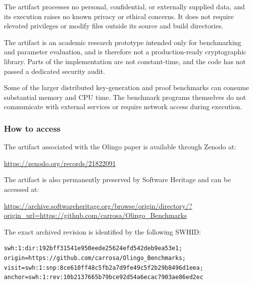 \documentclass[nonacm,sigconf]{acmart}
\begin{document}
The artifact processes no personal, confidential, or externally supplied data,
and its execution raises no known privacy or ethical concerns. It does not
require elevated privileges or modify files outside its source and build
directories.

The artifact is an academic research prototype intended only for benchmarking and parameter evaluation, and is therefore not a production-ready cryptographic library. Parts of
the implementation are not constant-time, and the code has not passed a
dedicated security audit.

Some of the larger distributed key-generation and proof benchmarks can consume
substantial memory and CPU time. The benchmark programs themselves do not communicate with external services or require network access during execution.


\subsubsection{How to access}



The artifact associated with the Olingo paper is available through Zenodo at:
\begin{center}
  \url{https://zenodo.org/records/21822091}
\end{center}

The artifact is also permanently preserved by Software Heritage and can be accessed at:
\begin{center}
  \url{https://archive.softwareheritage.org/browse/origin/directory/?origin_url=https://github.com/carrosa/Olingo_Benchmarks}
\end{center}

The exact archived revision is identified by the following SWHID:
\begin{verbatim}
swh:1:dir:192bff31541e950eede25624efd542deb9ea53e1;
origin=https://github.com/carrosa/Olingo_Benchmarks;
visit=swh:1:snp:8ce610ff48c5fb2a7d9fe49c5f2b29b8496d1eea;
anchor=swh:1:rev:10b2137665b79bce92d54a6ecac7903ae86ed2ec
\end{verbatim}
\end{document}
